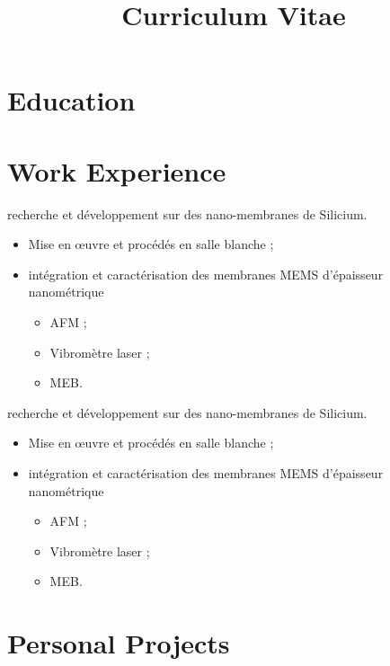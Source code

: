 \documentclass[11pt, a4paper, sans]{moderncv}
\title{Curriculum Vitae}
\begin{document}
\makecvtitle{}

\section{Education}


\section{Work Experience}

            {recherche et développement sur des nano-membranes de Silicium.}
{
\begin{itemize}
\item  Mise en œuvre et procédés en salle blanche ;
\item intégration et caractérisation des membranes MEMS d'épaisseur nanométrique
  \begin{itemize}
  \item AFM ;
  \item  Vibromètre laser ;
  \item MEB.
  \end{itemize}
\end{itemize}}

            {recherche et développement sur des nano-membranes de Silicium.}
{
\begin{itemize}
\item  Mise en œuvre et procédés en salle blanche ;
\item intégration et caractérisation des membranes MEMS d'épaisseur nanométrique
  \begin{itemize}
  \item AFM ;
  \item  Vibromètre laser ;
  \item MEB.
  \end{itemize}
\end{itemize}}

\section{Personal Projects}
\end{document}
